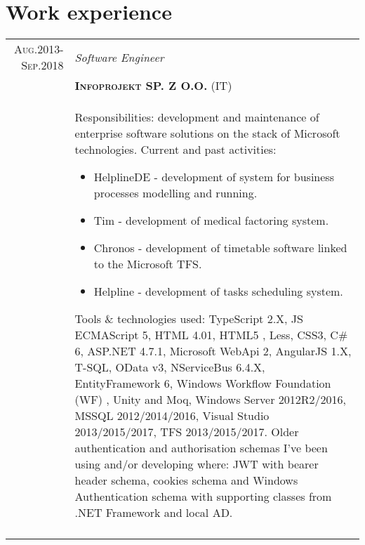 \documentclass[a4paper,12pt]{article}
\begin{document}
\section{Work experience}
\begin{tabular}{r|p{12cm}}
\textsc{Aug.2013-Sep.2018}
	&\emph{Software Engineer} \\
	&\textsc{\textbf{Infoprojekt SP. Z O.O.}} (IT) \\
	&\footnotesize{
		Responsibilities: development and maintenance of enterprise software solutions on the stack of Microsoft technologies. \newline
		Current and past activities:
		\begin{itemize}
			\item HelplineDE - development of system for business processes modelling and running.
		        \item Tim -  development of medical factoring system.
		        \item Chronos - development of timetable software linked to the Microsoft TFS.
			\item Helpline - development of tasks scheduling system.
		\end{itemize}
		Tools \& technologies used: \newline
		TypeScript 2.X, JS ECMAScript 5, HTML 4.01, HTML5 , Less, CSS3, C\# 6, ASP.NET 4.7.1, Microsoft WebApi 2, AngularJS 1.X, T-SQL,
		OData v3, NServiceBus 6.4.X, EntityFramework 6, Windows Workflow Foundation (WF) , Unity and Moq,
		Windows Server 2012R2/2016, MSSQL 2012/2014/2016, Visual Studio 2013/2015/2017, TFS 2013/2015/2017.
		Older authentication and authorisation schemas I've been using and/or developing where:
	    JWT with bearer header schema, cookies schema and Windows Authentication schema with supporting classes from .NET Framework and local AD.
	}\\
	\multicolumn{2}{c}{}\\

\end{tabular}
\end{document}

